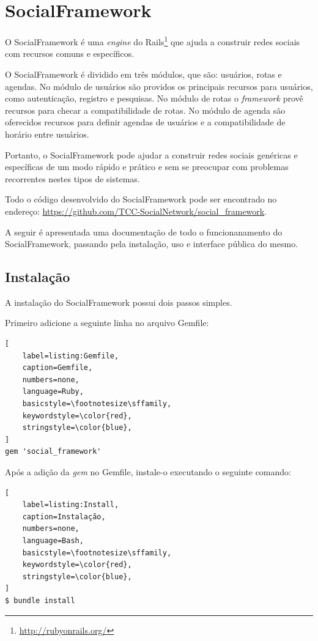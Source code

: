 \chapter{SocialFramework}
\label{chapter:SocialFramework}

O SocialFramework é uma \textit{engine} do Rails\footnote{\url{http://rubyonrails.org/}} que ajuda a construir redes sociais com recursos comuns e específicos.

O SocialFramework é dividido em três módulos, que são: usuários, rotas e agendas. No módulo de usuários são providos os principais recursos para usuários, como autenticação, registro e pesquisas. No módulo de rotas o \textit{framework} provê recursos para checar a compatibilidade de rotas. No módulo de agenda são oferecidos recursos para definir agendas de usuários e a compatibilidade de horário entre usuários.

Portanto, o SocialFramework pode ajudar a construir redes sociais genéricas e específicas de um modo rápido e prático e sem se preocupar com problemas recorrentes nestes tipos de sistemas.

Todo o código desenvolvido do SocialFramework pode ser encontrado no endereço: \url{https://github.com/TCC-SocialNetwork/social_framework}.

A seguir é apresentada uma documentação de todo o funcionanamento do SocialFramework, passando pela instalação, uso e interface pública do mesmo.

\section{Instalação}

A instalação do SocialFramework possui dois passos simples.

Primeiro adicione a seguinte linha no arquivo Gemfile:

\begin{lstlisting}[
    label=listing:Gemfile,
    caption=Gemfile,
    numbers=none,
    language=Ruby,
    basicstyle=\footnotesize\sffamily,
    keywordstyle=\color{red},
    stringstyle=\color{blue},
]
gem 'social_framework'
\end{lstlisting}

Após a adição da \textit{gem} no Gemfile, instale-o executando o seguinte comando:

\begin{lstlisting}[
    label=listing:Install,
    caption=Instalação,
    numbers=none,
    language=Bash,
    basicstyle=\footnotesize\sffamily,
    keywordstyle=\color{red},
    stringstyle=\color{blue},
]
$ bundle install
\end{lstlisting}


